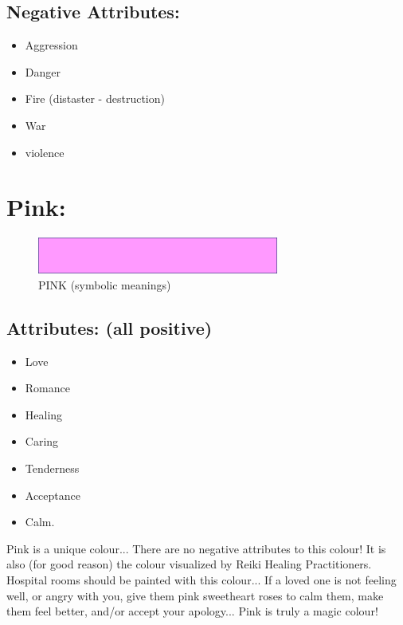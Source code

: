 \documentclass[openleft,oneside,showtrims]{memoir}
\begin{document}
\subsection{Negative Attributes:}
\label{sec:org2fee72d}

\begin{itemize}
\item Aggression
\item Danger
\item Fire (distaster - destruction)
\item War
\item violence
\end{itemize}

\section{Pink:}
\label{sec:orgc10439a}

\begin{figure}[htbp]
\centering
\includegraphics[width=300px]{./media/pink-banner.png}
\caption{\label{fig:HAP-WR-002}PINK (symbolic meanings)}
\end{figure}

\subsection{Attributes: (all positive)}
\label{sec:org6d9e278}

\begin{itemize}
\item Love
\item Romance
\item Healing
\item Caring
\item Tenderness
\item Acceptance
\item Calm.
\end{itemize}

Pink is a unique colour... There are no negative attributes to this colour! It is also (for good reason) the colour visualized by Reiki Healing Practitioners. Hospital rooms should be painted with this colour... If a loved one is not feeling well, or angry with you, give them pink sweetheart roses to calm them, make them feel better, and/or accept your apology... Pink is truly a magic colour!
\end{document}
